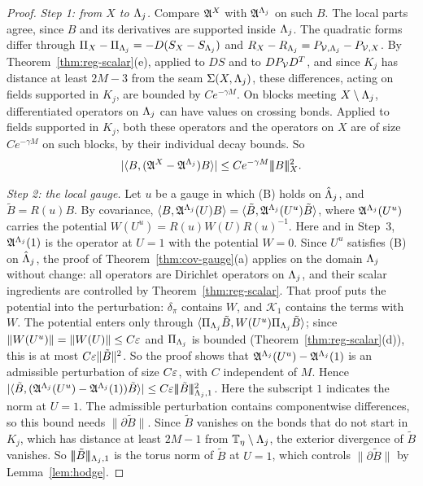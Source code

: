 \begin{proof}
\emph{Step 1: from $X$ to $\Lambda_j$.} Compare $\mathfrak A^X$ with $\mathfrak A^{\Lambda_j}$ on such $B$. The local parts agree, since $B$ and its derivatives are supported inside $\Lambda_j$. The quadratic forms differ through $\Pi_X-\Pi_{\Lambda_j}=-D(S_X-S_{\Lambda_j})$ and $R_X-R_{\Lambda_j}=P_{\mathcal V,\Lambda_j}-P_{\mathcal V,X}$. By Theorem~\ref{thm:reg-scalar}(e), applied to $DS$ and to $DP_\mathcal V D^T$, and since $K_j$ has distance at least $2M-3$ from the seam $\Sigma(X,\Lambda_j)$, these differences, acting on fields supported in $K_j$, are bounded by $Ce^{-\gamma M}$. On blocks meeting $X\setminus\Lambda_j$, differentiated operators on $\Lambda_j$ can have values on crossing bonds. Applied to fields supported in $K_j$, both these operators and the operators on $X$ are of size $Ce^{-\gamma M}$ on such blocks, by their individual decay bounds. So
\[
|\langle B,(\mathfrak A^X-\mathfrak A^{\Lambda_j})B\rangle|\le Ce^{-\gamma M}|\!|\!|B|\!|\!|_X^2 .
\]

\emph{Step 2: the local gauge.} Let $u$ be a gauge in which (B) holds on $\hat{\Lambda}_j$, and $\tilde B=R(u)B$. By covariance, $\langle B,\mathfrak A^{\Lambda_j}(U)B\rangle=\langle \tilde B,\mathfrak A^{\Lambda_j}(U^u)\tilde B\rangle$, where $\mathfrak A^{\Lambda_j}(U^u)$ carries the potential $W(U^u)=R(u)W(U)R(u)^{-1}$. Here and in Step~3, $\mathfrak A^{\Lambda_j}(1)$ is the operator at $U=1$ with the potential $W=0$. Since $U^u$ satisfies (B) on $\hat{\Lambda}_j$, the proof of Theorem~\ref{thm:cov-gauge}(a) applies on the domain $\Lambda_j$ without change: all operators are Dirichlet operators on $\Lambda_j$, and their scalar ingredients are controlled by Theorem~\ref{thm:reg-scalar}. That proof puts the potential into the perturbation: $\delta_\pi$ contains $W$, and $\mathcal K_1$ contains the terms with $W$. The potential enters only through $\langle \Pi_{\Lambda_j}\tilde B,W(U^u)\Pi_{\Lambda_j}\tilde B\rangle$; since $\|W(U^u)\|=\|W(U)\|\le C\varepsilon$ and $\Pi_{\Lambda_j}$ is bounded (Theorem~\ref{thm:reg-scalar}(d)), this is at most $C\varepsilon\|\tilde B\|^2$. So the proof shows that $\mathfrak A^{\Lambda_j}(U^u)-\mathfrak A^{\Lambda_j}(1)$ is an admissible perturbation of size $C\varepsilon$, with $C$ independent of $M$. Hence $|\langle \tilde B,(\mathfrak A^{\Lambda_j}(U^u)-\mathfrak A^{\Lambda_j}(1))\tilde B\rangle|\le C\varepsilon|\!|\!|\tilde B|\!|\!|^2_{\Lambda_j,1}$. Here the subscript $1$ indicates the norm at $U=1$. The admissible perturbation contains componentwise differences, so this bound needs $\|\partial\tilde B\|$. Since $\tilde B$ vanishes on the bonds that do not start in $K_j$, which has distance at least $2M-1$ from $\mathbb T_\eta\setminus\Lambda_j$, the exterior divergence of $\tilde B$ vanishes. So $|\!|\!|\tilde B|\!|\!|_{\Lambda_j,1}$ is the torus norm of $\tilde B$ at $U=1$, which controls $\|\partial\tilde B\|$ by Lemma~\ref{lem:hodge}.


\end{proof}
